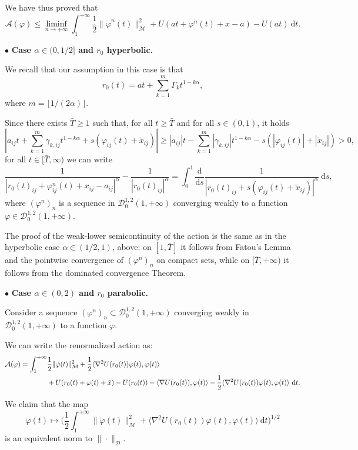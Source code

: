 \documentclass[a4paper,10pt]{amsart}
\newcommand{\ud}{\mathrm{d}}
\theoremstyle{plain}
\theoremstyle{definition}
\numberwithin{equation}{section}
\numberwithin{thm}{section}
\begin{document}
We have thus proved that 
\[
     \mathcal{A}(\varphi) \leq \liminf_{n\rightarrow+\infty} \int_{1}^{+\infty} \frac{1}{2} \|\dot{\varphi}^n(t)\|_\mathcal{M}^2 + U(at + \varphi^n(t) + x - a) - U(at)\ \ud t.
\]

\noindent $\bullet$ {\bf Case $\alpha \in (0,1/2]$ and $r_0$ hyperbolic.}

We recall that our assumption in this case is that
\[
r_0(t) = at + \sum_{k=1}^{m} \Gamma_k t^{1-k\alpha},
\]
where $m=\lfloor 1/(2\alpha)\rfloor$. 

Since there exists $\bar T\ge1$ such that, for all $t\ge\bar T$ and for all $s\in(0,1)$, it holds 
\[
|a_{ij}t + \sum_{k=1}^{m} \gamma_{k,ij} t^{1-k\alpha} + s(\varphi_{ij}(t) + \tilde x_{ij})|\ge |a_{ij}|t - \sum_{k=1}^{m} |\gamma_{k,ij}| t^{1-k\alpha}  - s(|\varphi_{ij}(t)| + |\tilde x_{ij}|) > 0,
\]
for all $t\in[\bar T,\infty)$ we can write
\[
\frac{1}{|r_0(t)_{ij}+  \varphi^n_{ij}(t) +x_{ij} - a_{ij}|^\alpha} - \frac{1}{|r_0(t)_{ij}|^\alpha} = \int_{0}^{1} \frac{\ud}{\ud s} \frac{1}{|r_0(t)_{ij} + s(\varphi_{ij}(t)+\tilde x_{ij})|^\alpha}\ \ud s,
\]
where $(\varphi^n)_n$ is a sequence in $\mathcal{D}_0^{1,2}(1,+\infty)$ converging weakly to a function $\varphi\in\mathcal{D}_0^{1,2}(1,+\infty)$.

The proof of the weak-lower semicontinuity of the action is the same as in the hyperbolic case $\alpha \in (1/2,1)$, above: on $[1,\bar T]$ it follows from Fatou's Lemma and the pointwise convergence of  $(\varphi^n)_n$ on compact sets, while on $[\bar T,+\infty)$ it follows from the dominated convergence Theorem.

\noindent $\bullet$ {\bf Case $\alpha \in (0,2)$ and $r_0$ parabolic. }

Consider a sequence $(\varphi^n)_n\subset\mathcal{D}_0^{1,2}(1,+\infty)$ converging weakly in $\mathcal{D}_0^{1,2}(1,+\infty)$ to a function $\varphi$. 

We can write the renormalized action as:
\[
\begin{split}
\mathcal{A}(\varphi) = \int_{1}^{+\infty} &\frac{1}{2}\|\dot{\varphi}(t)\|_\mathcal{M}^2 + \frac{1}{2}\langle \nabla^2 U(r_0(t))\varphi(t),\varphi(t)\rangle\\
    &+ U(r_0(t)+\varphi(t)+\Tilde{x}) - U(r_0(t)) - \langle \nabla U(r_0(t)),\varphi(t)\rangle - \frac{1}{2}\langle \nabla^2 U(r_0(t))\varphi(t),\varphi(t)\rangle\ \ud t.
\end{split}
\]

We claim that the map 
\[
\varphi(t) \mapsto \bigg( \frac{1}{2}\int_{1}^{+\infty} \|\dot{\varphi}(t)\|_\mathcal{M}^2 + \langle \nabla^2 U(r_0(t))\varphi(t),\varphi(t)\rangle\ \ud t \bigg)^{1/2}
\]
is an equivalent norm to $\|\cdot\|_\mathcal{D}$. 
\end{document}
